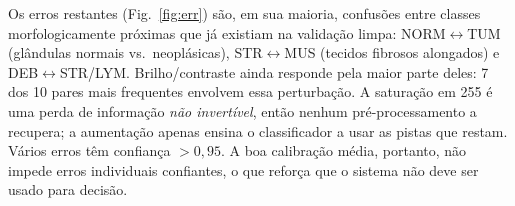 \documentclass[10pt,conference]{IEEEtran}
\begin{document}
Os erros restantes (Fig.~\ref{fig:err}) são, em sua maioria, confusões entre classes morfologicamente próximas que já existiam na validação limpa: NORM$\leftrightarrow$TUM (glândulas normais vs.\ neoplásicas), STR$\leftrightarrow$MUS (tecidos fibrosos alongados) e DEB$\leftrightarrow$STR/LYM. Brilho/contraste ainda responde pela maior parte deles: 7 dos 10 pares mais frequentes envolvem essa perturbação. A saturação em 255 é uma perda de informação \emph{não invertível}, então nenhum pré-processamento a recupera; a aumentação apenas ensina o classificador a usar as pistas que restam. Vários erros têm confiança $>0{,}95$. A boa calibração média, portanto, não impede erros individuais confiantes, o que reforça que o sistema não deve ser usado para decisão.

\end{document}
